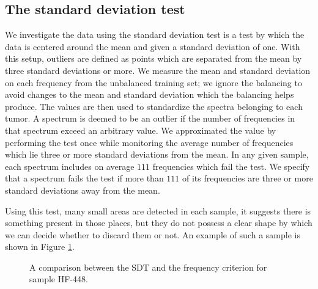 \subsection{The standard deviation test}

We investigate the data using the standard deviation test is a test by which the data is centered around the mean and given a standard deviation of one. With this setup, outliers are defined as points which are separated from the mean by three standard deviations or more. We measure the mean and standard deviation on each frequency from the unbalanced training set; we ignore the balancing to avoid changes to the mean and standard deviation which the balancing helps produce. The values are then used to standardize the spectra belonging to each tumor. A spectrum is deemed to be an outlier if the number of frequencies in that spectrum exceed an arbitrary value. We approximated the value by performing the test once while monitoring the average number of frequencies which lie three or more standard deviations from the mean. In any given sample, each spectrum includes on average $111$ frequencies which fail the test. We specify that a spectrum fails the test if more than $111$ of its frequencies are three or more standard deviations away from the mean.

Using this test, many small areas are detected in each sample, it suggests there is something present in those places, but they do not possess a clear shape by which we can decide whether to discard them or not. An example of such a sample is shown in Figure \ref{fig:stdHF448}.

\begin{figure}[H]

    \centering
    \qquad
    \caption{A comparison between the SDT and the frequency criterion for sample HF-448.
\label{fig:stdHF448}}%
\end{figure}

